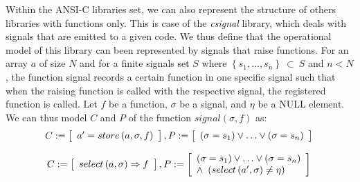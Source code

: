 \documentclass[a4paper]{llncs}
\begin{document}
Within the ANSI-C libraries set, we can also represent the structure
of others libraries with functions only. This is case of the \textit{csignal}
library, which deals with signals that are emitted to a given code.
We thus define that the operational model of this library can been represented
by signals that raise functions. For an array $a$ of size $N$ and
for a finite signals set $S$ where $\left\{s_{1},\ldots, s_{n}\right\}\:\subset\:S$
and $n < N$, the function signal records a certain function in one specific signal
such that when the raising function is called with the respective signal,
the registered function is called. Let $f$ be a function, $\sigma$ be a signal,
and $\eta$ be a NULL element. We can thus model $C$ and $P$
of the function $signal\left(\sigma, f\right)$ as:
%
\begin{equation}
\label{quantifier-free-formulae-sginal}
C := \left [ \begin{array}{ll}
                a' = store\left(a,\sigma,f\right) \\
              \end{array} \right ],  \\
P := \left [ \begin{array}{ll}
                \left(\sigma = s_{1}\right) \vee \ldots \vee \left(\sigma = s_{n}\right) \\
              \end{array} \right ]  \\
\end{equation}

%
\begin{equation}
\label{quantifier-free-formulae-raise}
C := \left [ \begin{array}{ll}
                select\left(a,\sigma\right) \Rightarrow f \\
              \end{array} \right ],  \\
P := \left [ \begin{array}{ll}
                \left(\sigma = s_{1}\right) \vee \ldots \vee \left(\sigma = s_{n}\right) \\
		\wedge \,\,\left(select\left(a',\sigma\right) \neq \eta\right) \\
              \end{array} \right ]  \\
\end{equation}
\vspace*{-4ex}

\end{document}
